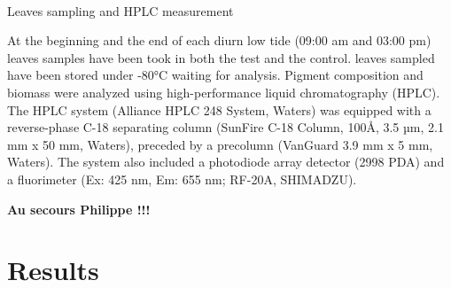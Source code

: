 \documentclass[
  number]{elsarticle}
\makeatletter
\let\oldparagraph\paragraph
\renewcommand{\paragraph}{
    \@ifstar
      \xxxParagraphStar
      \xxxParagraphNoStar
  }
\newcommand{\xxxParagraphStar}[1]{\oldparagraph*{#1}\mbox{}}
\newcommand{\xxxParagraphNoStar}[1]{\oldparagraph{#1}\mbox{}}
\makeatother
\begin{document}
\paragraph{Leaves sampling and HPLC
measurement}\label{leaves-sampling-and-hplc-measurement}

At the beginning and the end of each diurn low tide (09:00 am and 03:00
pm) leaves samples have been took in both the test and the control.
leaves sampled have been stored under -80°C waiting for analysis.
Pigment composition and biomass were analyzed using high-performance
liquid chromatography (HPLC). The HPLC system (Alliance HPLC 248 System,
Waters) was equipped with a reverse-phase C-18 separating column
(SunFire C-18 Column, 100Å, 3.5 µm, 2.1 mm x 50 mm, Waters), preceded by
a precolumn (VanGuard 3.9 mm x 5 mm, Waters). The system also included a
photodiode array detector (2998 PDA) and a fluorimeter (Ex: 425 nm, Em:
655 nm; RF-20A, SHIMADZU).

\textbf{Au secours Philippe !!!}

\section{Results}\label{results}


\renewcommand\refname{Bibliography}
  
\end{document}
